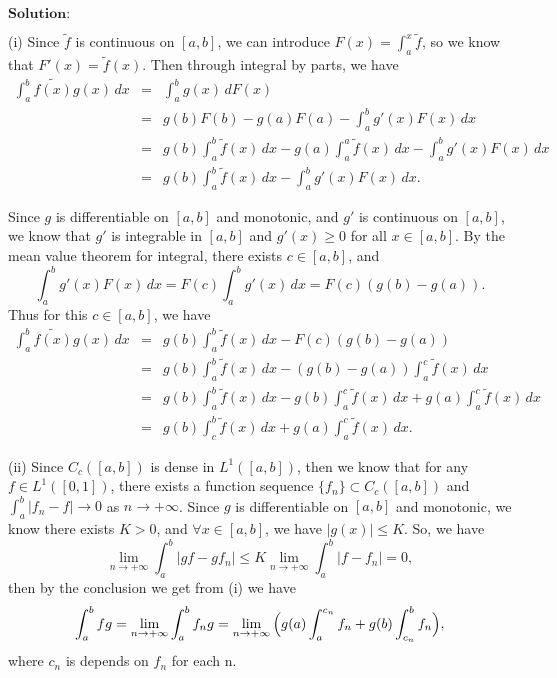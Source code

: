 \documentclass[12pt,a4paper]{ctexart}
\begin{document}
\vspace{8pt}
$\textbf{Solution:}$

(i) Since $\tilde{f}$ is continuous on $[a, b]$, we can introduce $F(x) = \int_{a}^{x} \tilde{f}$, so we know that $F'(x) = \tilde{f}(x)$. Then through integral by parts, we have 
\begin{eqnarray*}
\int_{a}^{b} \tilde{f(x)} g(x) \, d x & = & \int_{a}^{b} g(x) \, d F(x) \\
& = & g(b) F(b) - g(a) F(a) - \int_{a}^{b} g'(x) F(x) \, d x  \\
& = & g(b) \int_{a}^{b} \tilde{f} (x) \, d x - g(a) \int_{a}^{a} \tilde{f} (x) \, d x - \int_{a}^{b} g'(x) F(x) \, d x  \\
& = &  g(b) \int_{a}^{b} \tilde{f} (x) \, d x - \int_{a}^{b} g'(x) F(x) \, d x.
\end{eqnarray*}

Since $g$ is differentiable on $[a, b]$ and monotonic, and $g'$ is continuous on $[a, b]$, we know that $g'$ is integrable in $[a, b]$ and $g'(x) \geq 0$ for all $x \in [a, b]$. By the mean value theorem for integral, there exists $c \in [a, b]$, and
\begin{equation*}
   \int_{a}^{b} g'(x) F(x) \, d x = F(c) \int_{a}^{b} g'(x) \, d x = F(c) (g(b) - g(a)).
\end{equation*}
Thus for this $c \in [a, b]$, we have
\begin{eqnarray*}
\int_{a}^{b} \tilde{f(x)} g(x) \, d x & = & g(b) \int_{a}^{b} \tilde{f} (x) \, d x - F(c) (g(b) - g(a)) \\
& = & g(b) \int_{a}^{b} \tilde{f} (x) \, d x - (g(b) - g(a)) \int_{a}^{c} \tilde{f} (x) \, d x \\
& = & g(b) \int_{a}^{b} \tilde{f} (x) \, d x - g(b) \int_{a}^{c} \tilde{f} (x) \, d x + g(a) \int_{a}^{c} \tilde{f} (x) \, d x  \\
& = &  g(b) \int_{c}^{b} \tilde{f} (x) \, d x + g(a) \int_{a}^{c} \tilde{f} (x) \, d x.
\end{eqnarray*}

(ii) Since $C_{c}([a, b])$ is dense in $L^{1}([a, b])$, then we know that for any $f \in L^{1}([0, 1])$, there exists a function sequence $\{f_{n}\} \subset C_{c}([a, b])$ and $\int_{a}^{b} |f_{n} - f| \to 0$ as $n \to + \infty$.
Since $g$ is differentiable on $[a,b]$ and monotonic, we know there exists $K > 0$, and $\forall x \in [a, b]$, we have $|g(x)| \leq K$. So, we have
\begin{equation*}
   \lim_{n \to + \infty} \int_{a}^{b} |g f - g f_{n}| \leq K \lim_{n \to + \infty} \int_{a}^{b}|f - f_{n}| = 0,
\end{equation*}
then by the conclusion we get from (i) we have
\begin{equation*}
   \int_{a}^{b} f g = \lim_{n \to + \infty} \int_{a}^{b} f_{n} g = \lim_{n \to + \infty} \Big{(} g(a) \int_{a}^{c_{n}} f_{n} + g(b) \int_{c_{n}}^{b} f_{n} \Big{)},
\end{equation*}
where $c_{n}$ is depends on $f_{n}$ for each n.
\end{document}
